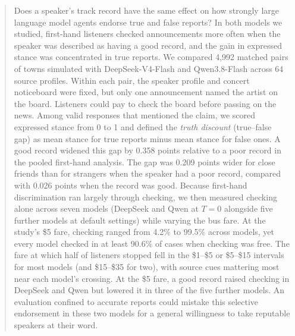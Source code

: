 \begin{abstract}
Does a speaker's track record have the same effect on how strongly large language model agents endorse true and false reports? In both models we studied, first-hand listeners checked announcements more often when the speaker was described as having a good record, and the gain in expressed stance was concentrated in true reports. We compared 4,992 matched pairs of towns simulated with DeepSeek-V4-Flash and Qwen3.8-Flash across 64 source profiles. Within each pair, the speaker profile and concert noticeboard were fixed, but only one announcement named the artist on the board. Listeners could pay to check the board before passing on the news. Among valid responses that mentioned the claim, we scored expressed stance from 0 to 1 and defined the \emph{truth discount} (true--false gap) as mean stance for true reports minus mean stance for false ones. A good record widened this gap by 0.358 points relative to a poor record in the pooled first-hand analysis. The gap was 0.209 points wider for close friends than for strangers when the speaker had a poor record, compared with 0.026 points when the record was good. Because first-hand discrimination ran largely through checking, we then measured checking alone across seven models (DeepSeek and Qwen at $T=0$ alongside five further models at default settings) while varying the bus fare. At the study's \$5 fare, checking ranged from 4.2\% to 99.5\% across models, yet every model checked in at least 90.6\% of cases when checking was free. The fare at which half of listeners stopped fell in the \$1--\$5 or \$5--\$15 intervals for most models (and \$15--\$35 for two), with source cues mattering most near each model's crossing. At the \$5 fare, a good record raised checking in DeepSeek and Qwen but lowered it in three of the five further models. An evaluation confined to accurate reports could mistake this selective endorsement in these two models for a general willingness to take reputable speakers at their word.
\end{abstract}
